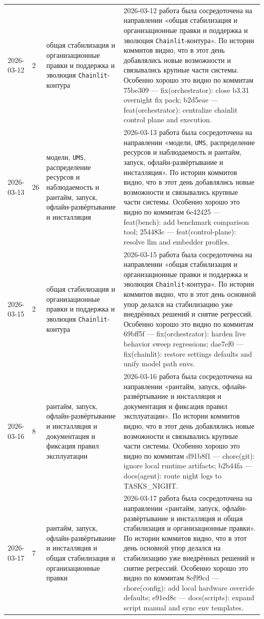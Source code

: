 \begin{longtable}{p{} p{} p{} p{}}
2026-03-12 & 2 & общая стабилизация и организационные правки и поддержка и эволюция \texttt{Chainlit}-контура & 2026-03-12 работа была сосредоточена на направлении «общая стабилизация и организационные правки и поддержка и эволюция \texttt{Chainlit}-контура». По истории коммитов видно, что в этот день добавлялись новые возможности и связывались крупные части системы. Особенно хорошо это видно по коммитам 75be309 — fix(orchestrator): close b3.31 overnight fix pack; b2d5eae — feat(orchestrator): centralize chainlit control plane and execution. \\
2026-03-13 & 26 & модели, \texttt{UMS}, распределение ресурсов и наблюдаемость и рантайм, запуск, офлайн-развёртывание и инсталляция & 2026-03-13 работа была сосредоточена на направлении «модели, \texttt{UMS}, распределение ресурсов и наблюдаемость и рантайм, запуск, офлайн-развёртывание и инсталляция». По истории коммитов видно, что в этот день добавлялись новые возможности и связывались крупные части системы. Особенно хорошо это видно по коммитам 6e42425 — feat(bench): add benchmark comparison tool; 254483c — feat(control-plane): resolve llm and embedder profiles. \\
2026-03-15 & 2 & общая стабилизация и организационные правки и поддержка и эволюция \texttt{Chainlit}-контура & 2026-03-15 работа была сосредоточена на направлении «общая стабилизация и организационные правки и поддержка и эволюция \texttt{Chainlit}-контура». По истории коммитов видно, что в этот день основной упор делался на стабилизацию уже внедрённых решений и снятие регрессий. Особенно хорошо это видно по коммитам 69bff5f — fix(orchestrator): harden live behavior sweep regressions; dae7ef0 — fix(chainlit): restore settings defaults and unify model path envs. \\
2026-03-16 & 8 & рантайм, запуск, офлайн-развёртывание и инсталляция и документация и фиксация правил эксплуатации & 2026-03-16 работа была сосредоточена на направлении «рантайм, запуск, офлайн-развёртывание и инсталляция и документация и фиксация правил эксплуатации». По истории коммитов видно, что в этот день добавлялись новые возможности и связывались крупные части системы. Особенно хорошо это видно по коммитам d91b8f1 — chore(git): ignore local runtime artifacts; b2b44fa — docs(agent): route night logs to TASKS\_NIGHT. \\
2026-03-17 & 7 & рантайм, запуск, офлайн-развёртывание и инсталляция и общая стабилизация и организационные правки & 2026-03-17 работа была сосредоточена на направлении «рантайм, запуск, офлайн-развёртывание и инсталляция и общая стабилизация и организационные правки». По истории коммитов видно, что в этот день основной упор делался на стабилизацию уже внедрённых решений и снятие регрессий. Особенно хорошо это видно по коммитам 8ef99cd — chore(config): add local hardware override defaults; e91ed8c — docs(scripts): expand script manual and sync env templates. \\

\end{longtable}
